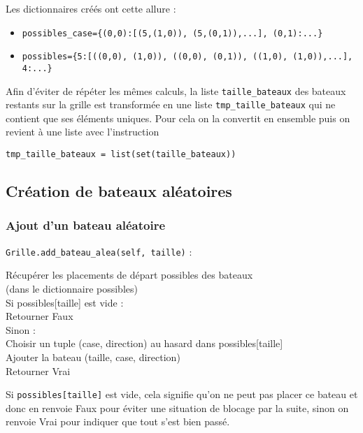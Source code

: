 Les dictionnaires créés ont cette allure :
\begin{itemize}
\item \texttt{possibles\_case=\{(0,0):[(5,(1,0)), (5,(0,1)),...], (0,1):...\}}
\item \texttt{possibles=\{5:[((0,0), (1,0)), ((0,0), (0,1)), ((1,0), (1,0)),...], 4:...\}}
\end{itemize}

\medskip

Afin d'éviter de répéter les mêmes calculs, la liste \texttt{taille\_bateaux} des bateaux restants sur la grille est transformée en une liste \texttt{tmp\_taille\_bateaux} qui ne contient que ses éléments uniques. Pour cela on la convertit en ensemble puis on revient à une liste avec l'instruction 
\begin{center}
\texttt{tmp\_taille\_bateaux = list(set(taille\_bateaux))}
\end{center}

\newpage

\subsection{Création de bateaux aléatoires}
\subsubsection{Ajout d'un bateau aléatoire}\label{add_bateau_alea}
\texttt{Grille.add\_bateau\_alea(self, taille)} :
\begin{algo1}
Récupérer les placements de départ possibles des bateaux\\
(dans le dictionnaire possibles)\\
Si possibles[taille] est vide :\\
Retourner Faux\\
Sinon :\\
Choisir un tuple (case, direction) au hasard dans possibles[taille]\\
Ajouter la bateau (taille, case, direction)\\
Retourner Vrai\\ 
\end{algo1}

Si \texttt{possibles[taille]} est vide, cela signifie qu'on ne peut pas placer ce bateau et donc en renvoie Faux pour éviter une situation de blocage par la suite, sinon on renvoie Vrai pour indiquer que tout s'est bien passé.

